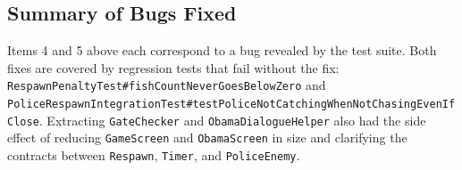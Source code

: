 \documentclass[12pt]{article}
\begin{document}
\subsection{Summary of Bugs Fixed}

Items 4 and 5 above each correspond to a bug revealed by the test suite. Both fixes are covered by regression tests that fail without the fix: \texttt{RespawnPenaltyTest\#fishCountNeverGoesBelowZero} and \texttt{PoliceRespawnIntegrationTest\#testPoliceNotCatchingWhenNotChasingEvenIfClose}. Extracting \texttt{GateChecker} and \texttt{ObamaDialogueHelper} also had the side effect of reducing \texttt{GameScreen} and \texttt{ObamaScreen} in size and clarifying the contracts between \texttt{Respawn}, \texttt{Timer}, and \texttt{PoliceEnemy}.

\end{document}
